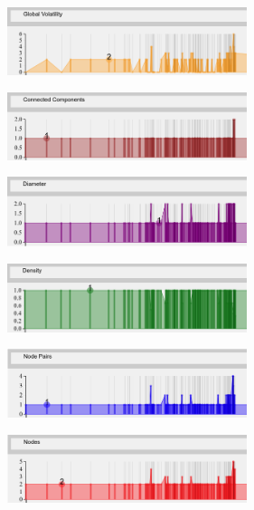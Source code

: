 \begin{multicols}{2}
\begin{center}
\includegraphics[trim={0 0 0 0}, width=70mm]{./Figures/margueriteGlobalVolatility.png}
\end{center}
\begin{center}
\includegraphics[trim={0 0 0 0}, width=70mm]{./Figures/margueriteConnectedComponents.png}
\end{center}
\begin{center}
\includegraphics[trim={0 0 0 0}, width=70mm]{./Figures/margueriteDiameter.png}
\end{center}
\begin{center}
\includegraphics[trim={0 0 0 0}, width=70mm]{./Figures/margueriteDensity.png}
\end{center}
\begin{center}
\includegraphics[trim={0 0 0 0}, width=70mm]{./Figures/margueriteNodePairs.png}
\end{center}
\begin{center}
\includegraphics[trim={0 0 0 0}, width=70mm]{./Figures/margueriteNodes.png}

\end{center}
\end{multicols}
